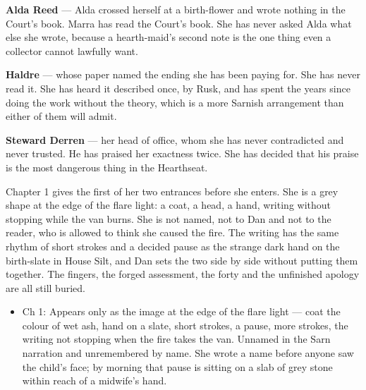 \documentclass{design/chronicle}
\begin{document}
{\textbf{Alda Reed} — Alda crossed herself at a birth-flower and wrote nothing in the Court’s book. Marra has read the Court’s book. She has never asked Alda what else she wrote, because a hearth-maid’s second note is the one thing even a collector cannot lawfully want.

\textbf{Haldre} — whose paper named the ending she has been paying for. She has never read it. She has heard it described once, by Rusk, and has spent the years since doing the work without the theory, which is a more Sarnish arrangement than either of them will admit.

\textbf{Steward Derren} — her head of office, whom she has never contradicted and never trusted. He has praised her exactness twice. She has decided that his praise is the most dangerous thing in the Hearthseat.

Chapter 1 gives the first of her two entrances before she enters. She is a grey shape at the edge of the flare light: a coat, a head, a hand, writing without stopping while the van burns. She is not named, not to Dan and not to the reader, who is allowed to think she caused the fire. The writing has the same rhythm of short strokes and a decided pause as the strange dark hand on the birth-slate in House Silt, and Dan sets the two side by side without putting them together. The fingers, the forged assessment, the forty and the unfinished apology are all still buried.

\begin{itemize}[leftmargin=1.4em,itemsep=1pt,topsep=3pt,parsep=0pt]

\item Ch 1: Appears only as the image at the edge of the flare light --- coat the colour of wet ash, hand on a slate, short strokes, a pause, more strokes, the writing not stopping when the fire takes the van. Unnamed in the Sarn narration and unremembered by name. She wrote a name before anyone saw the child’s face; by morning that pause is sitting on a slab of grey stone within reach of a midwife’s hand.

\end{itemize}
}
\end{document}
